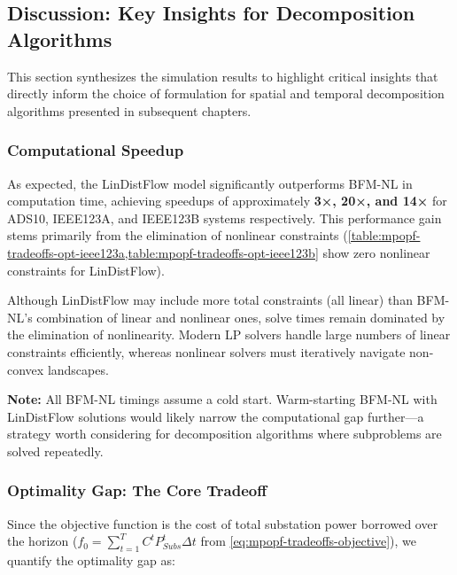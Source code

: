 \subsection{Discussion: Key Insights for Decomposition Algorithms}

This section synthesizes the simulation results to highlight critical insights that directly inform the choice of formulation for spatial and temporal decomposition algorithms presented in subsequent chapters.

\subsubsection{Computational Speedup}

As expected, the LinDistFlow model significantly outperforms BFM-NL in computation time, achieving speedups of approximately \textbf{3×, 20×, and 14×} for ADS10, IEEE123A, and IEEE123B systems respectively. This performance gain stems primarily from the elimination of nonlinear constraints (\cref{table:mpopf-tradeoffs-opt-ieee123a,table:mpopf-tradeoffs-opt-ieee123b} show zero nonlinear constraints for LinDistFlow).

Although LinDistFlow may include more total constraints (all linear) than BFM-NL's combination of linear and nonlinear ones, solve times remain dominated by the elimination of nonlinearity. Modern LP solvers handle large numbers of linear constraints efficiently, whereas nonlinear solvers must iteratively navigate non-convex landscapes.

\textbf{Note:} All BFM-NL timings assume a cold start. Warm-starting BFM-NL with LinDistFlow solutions would likely narrow the computational gap further—a strategy worth considering for decomposition algorithms where subproblems are solved repeatedly.

\subsubsection{Optimality Gap: The Core Tradeoff}

Since the objective function is the cost of total substation power borrowed over the horizon (\(f_0 = \sum_{t=1}^{T} C^t P^t_{Subs} \Delta t\) from \cref{eq:mpopf-tradeoffs-objective}), we quantify the optimality gap as:

